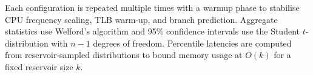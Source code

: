\documentclass[conference]{IEEEtran}
\begin{document}
Each configuration is repeated multiple times with a warmup phase to stabilise CPU frequency scaling, TLB warm-up, and branch prediction. Aggregate statistics use Welford's algorithm \cite{welford1962} and 95\% confidence intervals use the Student $t$-distribution with $n-1$ degrees of freedom. Percentile latencies are computed from reservoir-sampled distributions to bound memory usage at $O(k)$ for a fixed reservoir size $k$.







\end{document}
